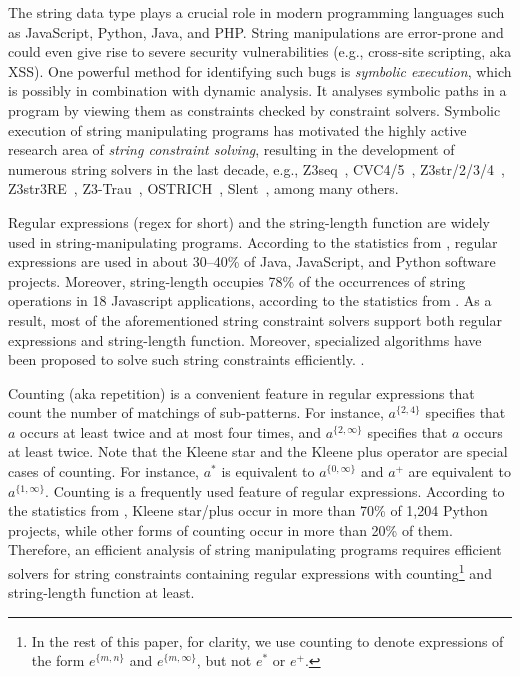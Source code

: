 The string data type plays a crucial role in modern programming languages such as JavaScript, Python, Java, and PHP. 
String manipulations are error-prone and could even give rise to severe security vulnerabilities (e.g., cross-site scripting, aka XSS). 
One powerful method for identifying such bugs is \emph{symbolic execution}, which is possibly in combination with dynamic analysis. It analyses symbolic paths in a program by viewing them as constraints checked by constraint solvers. 
%
Symbolic execution of string manipulating programs has motivated the highly active research area of \emph{string constraint solving}, resulting in the development of numerous string solvers in the last decade, e.g.,
Z3seq~\cite{z3seq}, CVC4/5~\cite{cvc4}, Z3str/2/3/4~\cite{Z3-str,Z3-str2,Z3-str3,BerzishMurphy2021}, Z3str3RE~\cite{BD+23}, 
Z3-Trau~\cite{Z3-trau}\cite{z3trau}, OSTRICH~\cite{CHL+19}, Slent~\cite{WC+18}, among many others. 

Regular expressions (regex for short) and the string-length function are widely used in string-manipulating programs. According to the statistics from \cite{CS16,DCSL18,WS18}, regular expressions are used in about 30–40\% of Java, JavaScript, and Python software projects. 
Moreover, string-length occupies 78\% of the occurrences of string operations in 18 Javascript applications, according to the statistics from \cite{malware_detection_3_kudzu}. 
As a result, most of the aforementioned string constraint solvers support both regular expressions and string-length function. Moreover, specialized algorithms have been proposed to solve such string constraints efficiently. \cite{LTR+15,BD+23}. 

Counting (aka repetition) is a convenient feature in regular expressions that count the number of matchings of sub-patterns. For instance, $a^{\{2, 4\}}$ specifies that $a$ occurs at least twice and at most four times, and $a^{\{2, \infty\}}$ specifies that $a$ occurs at least twice. 
Note that the Kleene star and the Kleene plus operator are special cases of counting. For instance, $a^*$ is equivalent to $a^{\{0,\infty\}}$ and $a^+$ are equivalent to $a^{\{1,\infty\}}$.
Counting is a frequently used feature of regular expressions. According to the statistics from \cite{CS16}, Kleene star/plus occur in more than 70\% of 1,204 Python projects, while other forms of counting occur in more than 20\% of them. Therefore, an efficient analysis of string manipulating programs requires efficient solvers for string constraints containing regular expressions with counting\footnote{In the rest of this paper, for clarity, we use counting to denote expressions of the form $e^{\{m, n\}}$ and  $e^{\{m, \infty\}}$, but not $e^*$ or $e^+$.} and string-length function at least. 

